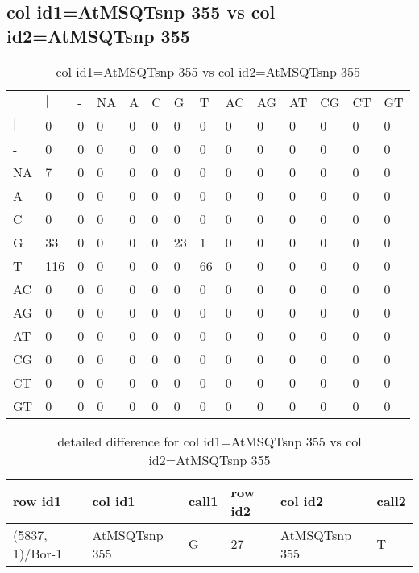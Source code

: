 \subsection{col id1=AtMSQTsnp 355 vs col id2=AtMSQTsnp 355}
\begin{center}
\begin{longtable}{|l|l|l|l|l|l|l|l|l|l|l|l|l|l|}
\caption{col id1=AtMSQTsnp 355 vs col id2=AtMSQTsnp 355} \label{table_dm682}\\
\hline
\\
\hline
&$|$&-&NA&A&C&G&T&AC&AG&AT&CG&CT&GT\\
$|$&0&0&0&0&0&0&0&0&0&0&0&0&0\\
-&0&0&0&0&0&0&0&0&0&0&0&0&0\\
NA&7&0&0&0&0&0&0&0&0&0&0&0&0\\
A&0&0&0&0&0&0&0&0&0&0&0&0&0\\
C&0&0&0&0&0&0&0&0&0&0&0&0&0\\
G&33&0&0&0&0&23&1&0&0&0&0&0&0\\
T&116&0&0&0&0&0&66&0&0&0&0&0&0\\
AC&0&0&0&0&0&0&0&0&0&0&0&0&0\\
AG&0&0&0&0&0&0&0&0&0&0&0&0&0\\
AT&0&0&0&0&0&0&0&0&0&0&0&0&0\\
CG&0&0&0&0&0&0&0&0&0&0&0&0&0\\
CT&0&0&0&0&0&0&0&0&0&0&0&0&0\\
GT&0&0&0&0&0&0&0&0&0&0&0&0&0\\
\hline
\end{longtable}
\end{center}

\begin{center}
\begin{longtable}{|l|l|l|l|l|l|}
\caption{detailed difference for col id1=AtMSQTsnp 355 vs col id2=AtMSQTsnp 355} \label{table_dm683}\\
\hline
row id1&col id1&call1&row id2&col id2&call2\\
\hline
(5837, 1)/Bor-1&AtMSQTsnp 355&G&27&AtMSQTsnp 355&T\\
\hline
\end{longtable}
\end{center}

